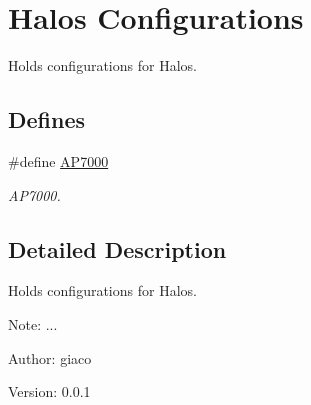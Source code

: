 \hypertarget{group___c_o_n_f_i_g}{
\section{Halos Configurations}
\label{group___c_o_n_f_i_g}
}
Holds configurations for Halos.  


\subsection*{Defines}
\begin{CompactItemize}
\item 
\hypertarget{group___c_o_n_f_i_g_g84b308e75c0d0ed50188f45a73af322e}{
\#define \hyperlink{group___c_o_n_f_i_g_g84b308e75c0d0ed50188f45a73af322e}{AP7000}}
\label{group___c_o_n_f_i_g_g84b308e75c0d0ed50188f45a73af322e}

\begin{CompactList}\small\item\em AP7000. \item\end{CompactList}\end{CompactItemize}


\subsection{Detailed Description}
Holds configurations for Halos. 

\begin{Desc}
\item[Note:]... \end{Desc}
\begin{Desc}
\item[Author:]giaco \end{Desc}
\begin{Desc}
\item[Version:]0.0.1 \end{Desc}
